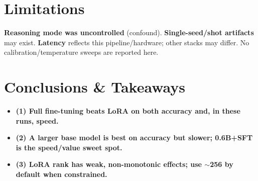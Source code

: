 \documentclass[11pt,a4paper]{article}
\begin{document}
\section{Limitations}
\textbf{Reasoning mode was uncontrolled} (confound). 
\textbf{Single-seed/shot artifacts} may exist. 
\textbf{Latency} reflects this pipeline/hardware; other stacks may differ.
No calibration/temperature sweeps are reported here.

\section{Conclusions \& Takeaways}
\begin{itemize}
  \item \textbf{(1) Full fine-tuning beats LoRA on both accuracy and, in these runs, speed.}
  \item \textbf{(2) A larger base model is best on accuracy but slower; 0.6B+SFT is the speed/value sweet spot.}
  \item \textbf{(3) LoRA rank has weak, non-monotonic effects; use $\sim$256 by default when constrained.}
\end{itemize}
\end{document}
